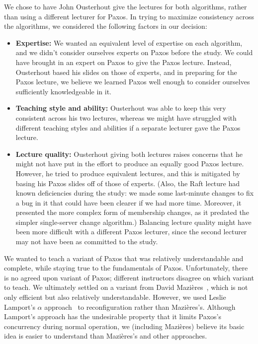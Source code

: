 We chose to have John Ousterhout give the lectures for both algorithms,
rather than using a different lecturer for Paxos. In trying to maximize
consistency across the algorithms, we considered the following factors
in our decision:
\begin{itemize}
\item \textbf{Expertise:} We wanted an equivalent level of expertise on
each algorithm, and we didn't consider ourselves experts on Paxos before
the study. We could have brought in an expert on Paxos to give the Paxos
lecture. Instead, Ousterhout based his slides on those of experts, and
in preparing for the Paxos lecture, we believe we learned Paxos well
enough to consider ourselves sufficiently knowledgeable in it.
\item \textbf{Teaching style and ability:} Ousterhout was able to keep
this very consistent across his two lectures, whereas we might have
struggled with different teaching styles and abilities if a separate
lecturer gave the Paxos lecture.
\item \textbf{Lecture quality:} Ousterhout giving both lectures raises
concerns that he might not have put in the effort to produce an equally
good Paxos lecture. However, he tried to produce equivalent lectures,
and this is mitigated by basing his Paxos slides off of those of
experts. (Also, the Raft lecture had known deficiencies during the
study: we made some last-minute changes to fix a bug in it that could
have been clearer if we had more time. Moreover, it presented the more
complex form of membership changes, as it predated the simpler
single-server change algorithm.)
Balancing lecture quality might
have been more difficult with a different Paxos lecturer, since the
second lecturer may not have been as committed to the study.
\end{itemize}


We wanted to teach a variant of Paxos that was relatively
understandable and complete, while staying true to the fundamentals of Paxos.
Unfortunately, there is no agreed upon variant of Paxos; different
instructors disagree on which variant to teach.
We ultimately settled on a variant from David Mazi\`eres~\cite{dmpaxos},
which is not only efficient but also relatively understandable.
However, we used Leslie Lamport's $\alpha$ approach~\cite{Lamport:2001} to
reconfiguration rather than Mazi\`eres's. Although Lamport's approach has the
undesirable property that it limits Paxos's concurrency during normal
operation, we (including Mazi\`eres) believe its basic idea is easier to
understand than Mazi\`eres's and other approaches.

